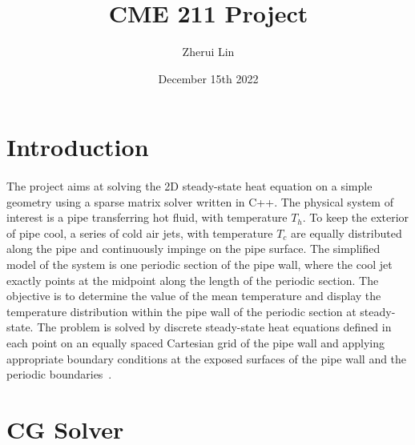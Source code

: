 \documentclass[12pt,letterpaper]{article}
\begin{document}
\title{CME 211 Project}
\author{Zherui Lin}
\date{December 15th 2022}
\maketitle
\section{Introduction}
\paragraph{} The project aims at solving the 2D steady-state heat equation on a simple geometry using a sparse matrix solver written in C++. The physical system of interest is a pipe transferring hot fluid, with temperature $T_h$. To keep the exterior of pipe cool, a series of cold air jets, with temperature $T_c$ are equally distributed along the pipe and continuously impinge on the pipe surface. The simplified model of the system is one periodic section of the pipe wall, where the cool jet exactly points at the midpoint along the length of the periodic section. The objective is to determine the value of the mean temperature and display the temperature distribution within the pipe wall of the periodic section at steady-state. The problem is solved by discrete steady-state heat equations defined in each point on an equally spaced Cartesian grid of the pipe wall and applying appropriate boundary conditions at the exposed surfaces of the pipe wall and the periodic boundaries~\cite{CME211:ProjectPart1}.
\section{CG Solver}
\end{document}
